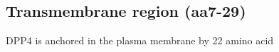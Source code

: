 \subsection{Transmembrane region (aa7-29)}

DPP4 is anchored in the plasma membrane by 22 amino acid